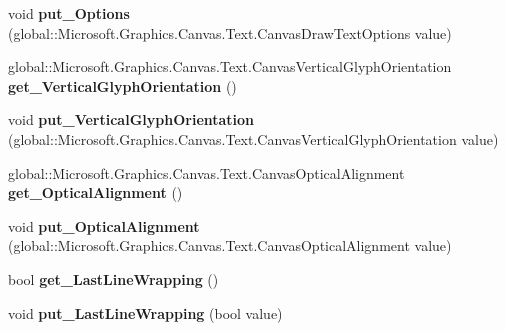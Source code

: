 \begin{DoxyCompactItemize}
void {\bfseries put\+\_\+\+Options} (global\+::\+Microsoft.\+Graphics.\+Canvas.\+Text.\+Canvas\+Draw\+Text\+Options value)
\item 
\mbox{\label{interface_microsoft_1_1_graphics_1_1_canvas_1_1_text_1_1_i_canvas_text_format_abc2a32d3aacea2f49232cd218d252da8}} 
global\+::\+Microsoft.\+Graphics.\+Canvas.\+Text.\+Canvas\+Vertical\+Glyph\+Orientation {\bfseries get\+\_\+\+Vertical\+Glyph\+Orientation} ()
\item 
\mbox{\label{interface_microsoft_1_1_graphics_1_1_canvas_1_1_text_1_1_i_canvas_text_format_a4f0382db5faf99e239642e76ec8e2269}} 
void {\bfseries put\+\_\+\+Vertical\+Glyph\+Orientation} (global\+::\+Microsoft.\+Graphics.\+Canvas.\+Text.\+Canvas\+Vertical\+Glyph\+Orientation value)
\item 
\mbox{\label{interface_microsoft_1_1_graphics_1_1_canvas_1_1_text_1_1_i_canvas_text_format_a6266ab0128ef88ed3a47c3b55f8d882a}} 
global\+::\+Microsoft.\+Graphics.\+Canvas.\+Text.\+Canvas\+Optical\+Alignment {\bfseries get\+\_\+\+Optical\+Alignment} ()
\item 
\mbox{\label{interface_microsoft_1_1_graphics_1_1_canvas_1_1_text_1_1_i_canvas_text_format_af5a78a267574fdae1a3a594f0d0e7d06}} 
void {\bfseries put\+\_\+\+Optical\+Alignment} (global\+::\+Microsoft.\+Graphics.\+Canvas.\+Text.\+Canvas\+Optical\+Alignment value)
\item 
\mbox{\label{interface_microsoft_1_1_graphics_1_1_canvas_1_1_text_1_1_i_canvas_text_format_adc2620964bc8e505aa61c08c6ac78893}} 
bool {\bfseries get\+\_\+\+Last\+Line\+Wrapping} ()
\item 
\mbox{\label{interface_microsoft_1_1_graphics_1_1_canvas_1_1_text_1_1_i_canvas_text_format_a3edf3bb3860fd65883e2b0a45e28b8b4}} 
void {\bfseries put\+\_\+\+Last\+Line\+Wrapping} (bool value)
\item 

\end{DoxyCompactItemize}
